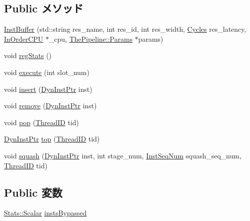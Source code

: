 \subsection*{Public メソッド}
\begin{DoxyCompactItemize}
\item 
\hyperlink{classInstBuffer_aed5f553acf1f60008e3cc5575617b8db}{InstBuffer} (std::string res\_\-name, int res\_\-id, int res\_\-width, \hyperlink{classCycles}{Cycles} res\_\-latency, \hyperlink{classInOrderCPU}{InOrderCPU} $\ast$\_\-cpu, \hyperlink{namespaceThePipeline_ab62ca16eeca26566ad2422b5df4943ce}{ThePipeline::Params} $\ast$params)
\item 
void \hyperlink{classInstBuffer_a4dc637449366fcdfc4e764cdf12d9b11}{regStats} ()
\item 
void \hyperlink{classInstBuffer_a7b7fff82f8c9cbdb02add1346f60bb9e}{execute} (int slot\_\-num)
\item 
void \hyperlink{classInstBuffer_ae55039f80e321715cf410a62b39d069c}{insert} (\hyperlink{classRefCountingPtr}{DynInstPtr} inst)
\item 
void \hyperlink{classInstBuffer_a21558187a079b60fba92c9c66725f051}{remove} (\hyperlink{classRefCountingPtr}{DynInstPtr} inst)
\item 
void \hyperlink{classInstBuffer_af6dbebba7f0784a65a148c6f06f7106d}{pop} (\hyperlink{base_2types_8hh_ab39b1a4f9dad884694c7a74ed69e6a6b}{ThreadID} tid)
\item 
\hyperlink{classRefCountingPtr}{DynInstPtr} \hyperlink{classInstBuffer_a636fc68dd4880da2b94630b1978a6e85}{top} (\hyperlink{base_2types_8hh_ab39b1a4f9dad884694c7a74ed69e6a6b}{ThreadID} tid)
\item 
void \hyperlink{classInstBuffer_a52235c5e3d912452f254dc45f1496fd2}{squash} (\hyperlink{classRefCountingPtr}{DynInstPtr} inst, int stage\_\-num, \hyperlink{inst__seq_8hh_a258d93d98edaedee089435c19ea2ea2e}{InstSeqNum} squash\_\-seq\_\-num, \hyperlink{base_2types_8hh_ab39b1a4f9dad884694c7a74ed69e6a6b}{ThreadID} tid)
\end{DoxyCompactItemize}
\subsection*{Public 変数}
\begin{DoxyCompactItemize}
\item 
\hyperlink{classStats_1_1Scalar}{Stats::Scalar} \hyperlink{classInstBuffer_af6881f44f674fa9f704b80ee1d0bdd17}{instsBypassed}
\end{DoxyCompactItemize}
